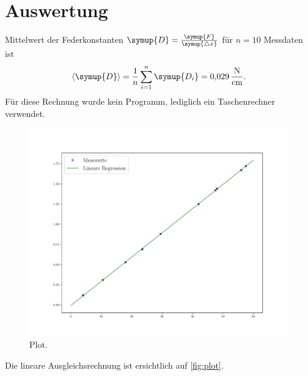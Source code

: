 \section{Auswertung}
\label{sec:Auswertung}
Mittelwert der Federkonstanten $\symup{D} = \frac{\symup{F}}{\symup{\triangle x}}$ für $n = 10$ Messdaten ist 
\begin{equation}
\langle \symup{D} \rangle = \frac{1}{n} \sum_{i=1}^n \symup{D_i} = \SI{0.029}{\newton\per\centi\meter}.
\end{equation}
Für diese Rechnung wurde kein Programm, lediglich ein Taschenrechner verwendet.

\begin{figure}
    \centering
    \includegraphics{Plot.pdf}
    \caption{Plot.}
    \label{fig:plot}
  \end{figure}
  
  
Die lineare Ausgleichsrechnung ist ersichtlich auf \autoref{fig:plot}.